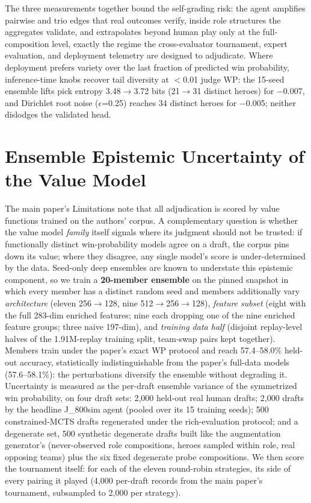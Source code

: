 \documentclass[journal]{IEEEtran}
\begin{document}
The three measurements together bound the self-grading risk: the agent amplifies pairwise and trio edges that real outcomes verify, inside role structures the aggregates validate, and extrapolates beyond human play only at the full-composition level, exactly the regime the cross-evaluator tournament, expert evaluation, and deployment telemetry are designed to adjudicate. Where deployment prefers variety over the last fraction of predicted win probability, inference-time knobs recover tail diversity at $<$0.01 judge WP: the 15-seed ensemble lifts pick entropy 3.48$\to$3.72 bits (21$\to$31 distinct heroes) for $-$0.007, and Dirichlet root noise ($\epsilon$=0.25) reaches 34 distinct heroes for $-$0.005; neither dislodges the validated head.

\section{Ensemble Epistemic Uncertainty of the Value Model}
\label{sec:ensemble}

The main paper's Limitations note that all adjudication is scored by value functions trained on the authors' corpus. A complementary question is whether the value model \textit{family} itself signals where its judgment should not be trusted: if functionally distinct win-probability models agree on a draft, the corpus pins down its value; where they disagree, any single model's score is under-determined by the data. Seed-only deep ensembles are known to understate this epistemic component, so we train a \textbf{20-member ensemble} on the pinned snapshot in which every member has a distinct random seed and members additionally vary \textit{architecture} (eleven 256$\to$128, nine 512$\to$256$\to$128), \textit{feature subset} (eight with the full 283-dim enriched features; nine each dropping one of the nine enriched feature groups; three naive 197-dim), and \textit{training data half} (disjoint replay-level halves of the 1.91M-replay training split, team-swap pairs kept together). Members train under the paper's exact WP protocol and reach 57.4--58.0\% held-out accuracy, statistically indistinguishable from the paper's full-data models (57.6--58.1\%): the perturbations diversify the ensemble without degrading it. Uncertainty is measured as the per-draft ensemble variance of the symmetrized win probability, on four draft sets: 2{,}000 held-out real human drafts; 2{,}000 drafts by the headline J\_800sim agent (pooled over its 15 training seeds); 500 constrained-MCTS drafts regenerated under the rich-evaluation protocol; and a degenerate set, 500 synthetic degenerate drafts built like the augmentation generator's (never-observed role compositions, heroes sampled within role, real opposing teams) plus the six fixed degenerate probe compositions. We then score the tournament itself: for each of the eleven round-robin strategies, its side of every pairing it played (4{,}000 per-draft records from the main paper's tournament, subsampled to 2{,}000 per strategy).
\end{document}
